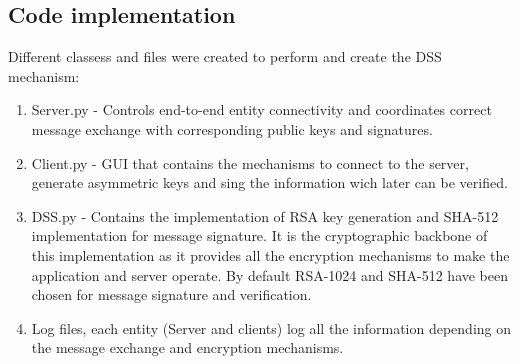 \documentclass[letterpaper,12pt]{article}
\begin{document}
\subsection{Code implementation}
Different classess and files were created to perform and create the DSS mechanism:
\begin{enumerate}
    \item Server.py - Controls end-to-end entity connectivity and coordinates correct message exchange with corresponding public keys and signatures.
    \item Client.py - GUI that contains the mechanisms to connect to the server, generate asymmetric keys and sing the information wich later can be verified.
    \item DSS.py - Contains the implementation of RSA key generation and SHA-512 implementation for message signature. It is the cryptographic backbone of this implementation as it provides all the encryption mechanisms to make the application and server operate. By default RSA-1024 and SHA-512 have been chosen for message signature and verification.
    \item Log files, each entity (Server and clients) log all the information depending on the message exchange and encryption mechanisms.
\end{enumerate}
\hline
\end{document}
